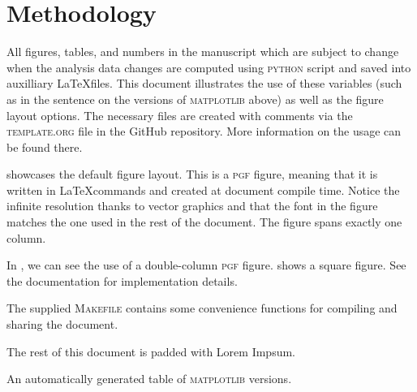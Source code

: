 
\section{Methodology}%
\label{sec:methodology}%

All figures, tables, and numbers in the manuscript which are subject
to change when the analysis data changes are computed using
\textsc{python} script and saved into auxilliary \LaTeX files. This document
illustrates the use of these variables (such as in the sentence on the versions of \textsc{matplotlib} above) as well as the figure layout options.
The necessary files are created with comments via the
\textsc{template.org} file in the GitHub repository. More information
on the usage can be found there.

 showcases the default figure
layout. This is a \textsc{pgf} figure, meaning that it is written in
\LaTeX commands and created at document compile time. Notice the
infinite resolution thanks to vector graphics and that the font in the
figure matches the one used in the rest of the document. The figure
spans exactly one column.

In , we can see the use of a double-column \textsc{pgf} figure.
 shows a square figure. See the
documentation for implementation details.

The supplied \textsc{Makefile} contains some convenience functions for
compiling and sharing the document. 

The rest of this document is padded with Lorem Impsum.

\lipsum

\begin{table}[t]
\caption{An automatically generated table of \textsc{matplotlib} versions.}
\label{tab:matplotlib_versions}

\end{table}
\lipsum[3-5]

